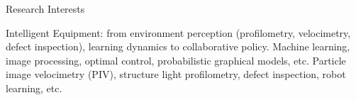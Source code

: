 \begin{rubric}{Research Interests}


\entry*[]%
 	Intelligent Equipment: from environment perception (profilometry, velocimetry, defect inspection), learning dynamics to collaborative policy.
%
\entry*[]%
	Machine learning, image processing, optimal control, probabilistic graphical models, etc.
%
\entry*[]%
	Particle image velocimetry (PIV), structure light profilometry, defect inspection, robot learning, etc.

\end{rubric}